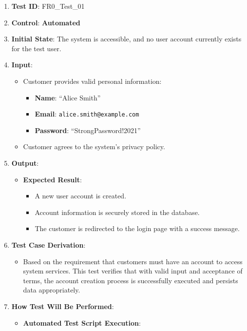 \documentclass[12pt, titlepage]{article}
\begin{document}
\begin{enumerate}
    \item \textbf{Test ID}: FR0\_Test\_01
    \item \textbf{Control}: \textbf{Automated}
    \item \textbf{Initial State}: The system is accessible, and no user account currently exists for the test user.
    \item \textbf{Input}:
    \begin{itemize}
        \item Customer provides valid personal information:
        \begin{itemize}
            \item \textbf{Name}: ``Alice Smith''
            \item \textbf{Email}: \texttt{alice.smith@example.com}
            \item \textbf{Password}: ``StrongPassword!2021''
        \end{itemize}
        \item Customer agrees to the system's privacy policy.
    \end{itemize}
    \item \textbf{Output}:
    \begin{itemize}
        \item \textbf{Expected Result}:
        \begin{itemize}
            \item A new user account is created.
            \item Account information is securely stored in the database.
            \item The customer is redirected to the login page with a success message.
        \end{itemize}
    \end{itemize}
    \item \textbf{Test Case Derivation}:
    \begin{itemize}
        \item Based on the requirement that customers must have an account to access system services. This test verifies that with valid input and acceptance of terms, the account creation process is successfully executed and persists data appropriately.
    \end{itemize}
    \item \textbf{How Test Will Be Performed}:
    \begin{itemize}
        \item \textbf{Automated Test Script Execution}:

\end{itemize}
\end{enumerate}
\end{document}
